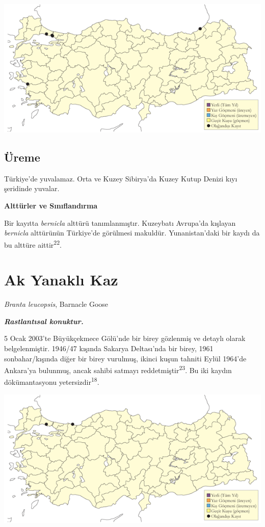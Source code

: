 \documentclass[
  letterpaper,
  DIV=11,
  numbers=noendperiod]{scrreprt}
\begin{document}
\includegraphics{images/harita_Page_005.png}

\hypertarget{uxfcreme-4}{%
\subsection{\texorpdfstring{\textbf{Üreme}}{Üreme}}\label{uxfcreme-4}}

Türkiye'de yuvalamaz. Orta ve Kuzey Sibirya'da Kuzey Kutup Denizi kıyı
şeridinde yuvalar.

\textbf{Alttürler ve Sınıflandırma}

Bir kayıtta \emph{bernicla} alttürü tanımlanmıştır. Kuzeybatı Avrupa'da
kışlayan \emph{bernicla} alttürünün Türkiye'de görülmesi makuldür.
Yunanistan'daki bir kaydı da bu alttüre aittir\textsuperscript{22}.

\hypertarget{ak-yanaklux131-kaz}{%
\section{Ak Yanaklı Kaz}\label{ak-yanaklux131-kaz}}

\emph{Branta leucopsis}, Barnacle Goose

\textbf{\emph{Rastlantısal konuktur.}}

5 Ocak 2003'te Büyükçekmece Gölü'nde bir birey gözlenmiş ve detaylı
olarak belgelenmiştir. 1946/47 kışında Sakarya Deltası'nda bir birey,
1961 sonbahar/kışında diğer bir birey vurulmuş, ikinci kuşun tahniti
Eylül 1964'de Ankara'ya bulunmuş, ancak sahibi satmayı
reddetmiştir\textsuperscript{23}. Bu iki kaydın dökümantasyonu
yetersizdir\textsuperscript{18}.

\includegraphics{images/harita_Page_006.png}
\end{document}
